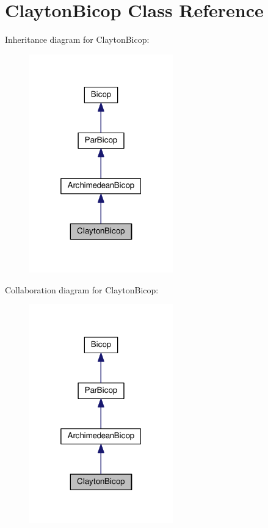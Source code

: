 \hypertarget{class_clayton_bicop}{\section{Clayton\+Bicop Class Reference}
\label{class_clayton_bicop}
}


Inheritance diagram for Clayton\+Bicop\+:
\nopagebreak
\begin{figure}[H]
\begin{center}
\leavevmode
\includegraphics[width=176pt]{class_clayton_bicop__inherit__graph}
\end{center}
\end{figure}


Collaboration diagram for Clayton\+Bicop\+:
\nopagebreak
\begin{figure}[H]
\begin{center}
\leavevmode
\includegraphics[width=176pt]{class_clayton_bicop__coll__graph}
\end{center}
\end{figure}
